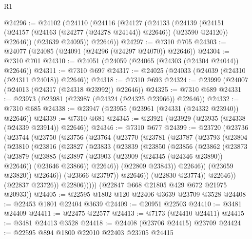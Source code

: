 \begin{lexlean}{R1}
\begin{coremodule}
@24296 := @24102
    (@24110
      (@24116
        (@24127
          (@24133
            (@24139
              (@24151 (@24157 (@24163 (@24277 (@24278 @24144)) @22646)) (@23590 @24120))
              @22646))
          (@23639 @24095))
        @22646))
@24297 := @7310 @705
@24303 := @24077 (@24085 (@24091 (@24296 (@24297 @24070)) @22646))
@24304 := @7310 @701
@24310 := @24051 (@24059 (@24065 (@24303 (@24304 @24044)) @22646))
@24311 := @7310 @697
@24317 := @24025 (@24033 (@24039 (@24310 (@24311 @24018)) @22646))
@24318 := @7310 @693
@24324 := @23999 (@24007 (@24013 (@24317 (@24318 @23992)) @22646))
@24325 := @7310 @689
@24331 := @23973 (@23981 (@23987 (@24324 (@24325 @23966)) @22646))
@24332 := @7310 @685
@24338 := @23947 (@23955 (@23961 (@24331 (@24332 @23940)) @22646))
@24339 := @7310 @681
@24345 := @23921 (@23929 (@23935 (@24338 (@24339 @23914)) @22646))
@24346 := @7310 @677
@24399 := @23720
    (@23736
      (@23744
        (@23750
          (@23756
            (@23764
              (@23770
                (@23781
                  (@23787
                    (@23793
                      (@23804
                        (@23810
                          (@23816
                            (@23827
                              (@23833
                                (@23839
                                  (@23850
                                    (@23856
                                      (@23862
                                        (@23873
                                          (@23879
                                            (@23885
                                              (@23897
                                                (@23903 (@23909 (@24345 (@24346 @23890)) @22646))
                                                (@23646 @23866))
                                              @22646))
                                          (@22809 @23843))
                                        @22646))
                                    (@23659 @23820))
                                  @22646))
                              (@23666 @23797))
                            @22646))
                        (@22830 @23774))
                      @22646))
                  (@22837 @23726))
                @22806)))))
      (@22847 @668 @21805 @429 @672 @21975 @20933))
@24405 := @22595 @1802 @120 @22406 @3639 @23709 @3528
@24408 := @22453 @1801 @22404 @3639
@24409 := @20951 @22503
@24410 := @3481 @24409
@24411 := @22475 @22577
@24413 := @7173 (@24410 @24411)
@24415 := @3481 @24413 @3528
@24418 := @24408 (@23706 @24415) @23709
@24424 := @22595 @894 @1800 @22010 @22403 @23705 @24415

\end{coremodule}
\end{lexlean}
